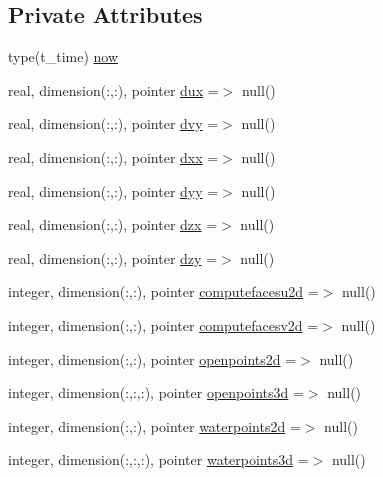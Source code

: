 \subsection*{Private Attributes}
\begin{DoxyCompactItemize}
\item 
type(t\+\_\+time) \mbox{\hyperlink{structmodulesediment_1_1t__external_a119320015c0dc4b110f16c44d2a4a5af}{now}}
\item 
real, dimension(\+:,\+:), pointer \mbox{\hyperlink{structmodulesediment_1_1t__external_a99da542a46ac9013411cbc6788240014}{dux}} =$>$ null()
\item 
real, dimension(\+:,\+:), pointer \mbox{\hyperlink{structmodulesediment_1_1t__external_ac283d2b5c261495c28f6976846ebeaf0}{dvy}} =$>$ null()
\item 
real, dimension(\+:,\+:), pointer \mbox{\hyperlink{structmodulesediment_1_1t__external_a06a107e118a33a98ce8b04344ee46de7}{dxx}} =$>$ null()
\item 
real, dimension(\+:,\+:), pointer \mbox{\hyperlink{structmodulesediment_1_1t__external_a9307d40af323360428852a6fe2a20832}{dyy}} =$>$ null()
\item 
real, dimension(\+:,\+:), pointer \mbox{\hyperlink{structmodulesediment_1_1t__external_a78959fa79cd4b13addcf54dcf71d075e}{dzx}} =$>$ null()
\item 
real, dimension(\+:,\+:), pointer \mbox{\hyperlink{structmodulesediment_1_1t__external_ad1545fc1e5b45f2ed2dacd651ebb63bc}{dzy}} =$>$ null()
\item 
integer, dimension(\+:,\+:), pointer \mbox{\hyperlink{structmodulesediment_1_1t__external_a9366dc5bc5c823b020e3118670a2c9c6}{computefacesu2d}} =$>$ null()
\item 
integer, dimension(\+:,\+:), pointer \mbox{\hyperlink{structmodulesediment_1_1t__external_a6e914359f6682bc1f1b5dba332a5c864}{computefacesv2d}} =$>$ null()
\item 
integer, dimension(\+:,\+:), pointer \mbox{\hyperlink{structmodulesediment_1_1t__external_a5d77f65bdb733c98db2ac659172dc2e4}{openpoints2d}} =$>$ null()
\item 
integer, dimension(\+:,\+:,\+:), pointer \mbox{\hyperlink{structmodulesediment_1_1t__external_a78a6ab06845a4a7f1c792f38ecd42d55}{openpoints3d}} =$>$ null()
\item 
integer, dimension(\+:,\+:), pointer \mbox{\hyperlink{structmodulesediment_1_1t__external_a4808c76cdafb2fcb0dea6fa9e8e9d389}{waterpoints2d}} =$>$ null()
\item 
integer, dimension(\+:,\+:,\+:), pointer \mbox{\hyperlink{structmodulesediment_1_1t__external_aed010d5025de7e7c3bc2e06c0ede1d65}{waterpoints3d}} =$>$ null()

\end{DoxyCompactItemize}

